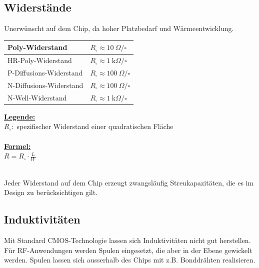 \subsection{Widerstände}
Unerwünscht auf dem Chip, da hoher Platzbedarf und Wärmeentwicklung.
\\[2ex]
\begin{minipage}[c]{0.55\textwidth}
	\begin{tabular}{|l|l|}
		\hline
		Poly-Widerstand & $R_\square \approx \SI{10}{\Omega \per}\square$\\ \hline
		HR-Poly-Widerstand & $R_\square \approx \SI{1}{\kilo\Omega \per}\square$\\ \hline
		P-Diffusions-Widerstand & $R_\square \approx \SI{100}{\Omega \per}\square$\\ \hline
		N-Diffusions-Widerstand & $R_\square \approx \SI{100}{\Omega \per}\square$\\ \hline
		N-Well-Widerstand & $R_\square \approx \SI{1}{\kilo\Omega \per}\square$\\ \hline
	\end{tabular}
\end{minipage}
\begin{minipage}[c]{0.45\textwidth}
	\uline{\textbf{Legende:}}\\
	$R_\square:$ spezifischer Widerstand einer quadratischen Fläche\\\\
	\uline{\textbf{Formel:}}\\
	$R = R_\square \cdot \frac{L}{W}$
\end{minipage}
\\[2ex]
Jeder Widerstand auf dem Chip erzeugt zwangsläufig Streukapazitäten, die es im Design zu berücksichtigen gilt.

\subsection{Induktivitäten}
Mit Standard CMOS-Technologie lassen sich Induktivitäten nicht gut herstellen.
Für RF-Anwendungen werden Spulen eingesetzt, die aber in der Ebene gewickelt werden.
Spulen lassen sich ausserhalb des Chips mit z.B. Bonddrähten realisieren.